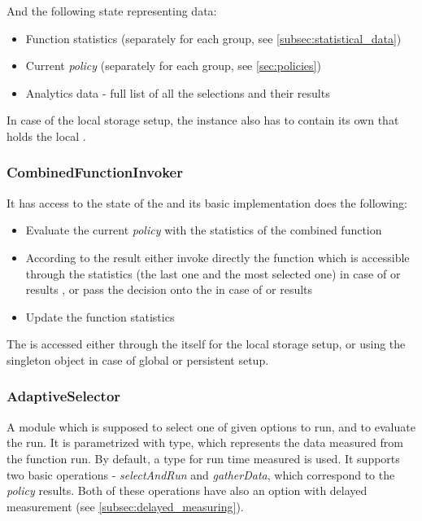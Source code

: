 And the following state representing data:

\begin{itemize}
	\item Function statistics (separately for each group, see \ref{subsec:statistical_data})
	\item Current \textit{policy} (separately for each group, see \ref{sec:policies})
	\item Analytics data - full list of all the selections and their results
\end{itemize}

In case of the local storage setup, the instance also has to contain its own  that holds the local .

\subsubsection{CombinedFunctionInvoker}

It has access to the state of the  and its basic implementation does the following:

\begin{itemize}
	\item Evaluate the current \textit{policy} with the statistics of the combined function
	\item According to the result either invoke directly the function which is accessible through the statistics (the last one and the most selected one) in case of  or  results , or pass the decision onto the  in case of  or  results
	\item Update the function statistics
\end{itemize}

The  is accessed either through the  itself for the local storage setup, or using the singleton object  in case of global or persistent setup.

\subsubsection{AdaptiveSelector}

A module which is supposed to select one of given options to run, and to evaluate the run. It is parametrized with  type, which represents the data measured from the function run. By default, a  type for run time measured is used. It supports two basic operations - \textit{selectAndRun} and \textit{gatherData}, which correspond to the \textit{policy} results. Both of these operations have also an option with delayed measurement (see \ref{subsec:delayed_measuring}).

